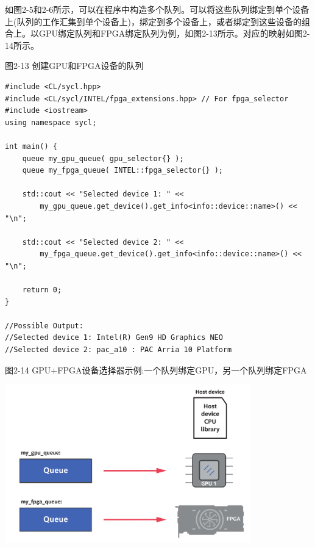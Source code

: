 如图2-5和2-6所示，可以在程序中构造多个队列。可以将这些队列绑定到单个设备上(队列的工作汇集到单个设备上)，绑定到多个设备上，或者绑定到这些设备的组合上。以GPU绑定队列和FPGA绑定队列为例，如图2-13所示。对应的映射如图2-14所示。\par

图2-13 创建GPU和FPGA设备的队列
\begin{lstlisting}[caption={}]
#include <CL/sycl.hpp>
#include <CL/sycl/INTEL/fpga_extensions.hpp> // For fpga_selector
#include <iostream>
using namespace sycl;

int main() {
	queue my_gpu_queue( gpu_selector{} );
	queue my_fpga_queue( INTEL::fpga_selector{} );
	
	std::cout << "Selected device 1: " <<
		my_gpu_queue.get_device().get_info<info::device::name>() << "\n";
		
	std::cout << "Selected device 2: " <<
		my_fpga_queue.get_device().get_info<info::device::name>() << "\n";
	
	return 0;
}

//Possible Output:
//Selected device 1: Intel(R) Gen9 HD Graphics NEO
//Selected device 2: pac_a10 : PAC Arria 10 Platform
\end{lstlisting}

\hspace*{\fill} \par %
图2-14 GPU+FPGA设备选择器示例:一个队列绑定GPU，另一个队列绑定FPGA
\begin{center}
	\includegraphics[width=0.8\textwidth]{content/chapter-2/images/8}
\end{center}












